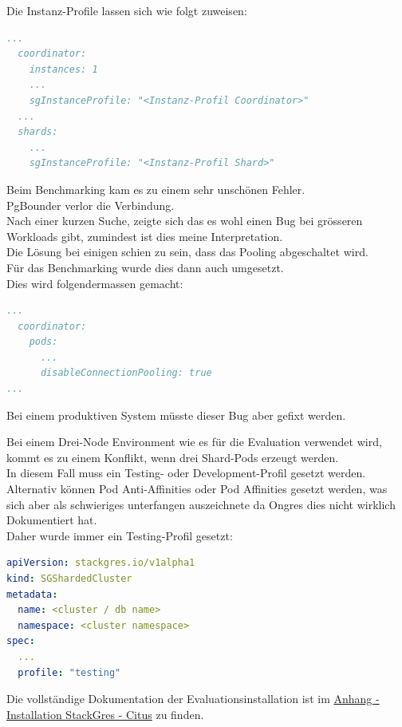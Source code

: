 \begin{flushleft}
    Die Instanz-Profile lassen sich wie folgt zuweisen:
\lstset{style=gra_codestyle}
\begin{lstlisting}[language=yaml, caption=StackGres-Citus - Instanz-Profile, captionpos=b,label={lst:stackgres-citus-sginstanceprofile},breaklines=true]
  ...
  coordinator:
    instances: 1
    ...
    sgInstanceProfile: "<Instanz-Profil Coordinator>"
  ...
  shards:
    ...
    sgInstanceProfile: "<Instanz-Profil Shard>"
\end{lstlisting}
\end{flushleft}
\begin{flushleft}
    Beim Benchmarking kam es zu einem sehr unschönen Fehler.\\
    PgBounder verlor die Verbindung.\\
    Nach einer kurzen Suche, zeigte sich das es wohl einen Bug bei grösseren Workloads gibt, zumindest ist dies meine Interpretation.\\
    Die Lösung bei einigen schien zu sein, dass das Pooling abgeschaltet wird\cite{JU2PRK9L}.\\
    Für das Benchmarking wurde dies dann auch umgesetzt.\\
    Dies wird folgendermassen gemacht:
\lstset{style=gra_codestyle}
\begin{lstlisting}[language=yaml, caption=StackGres-Citus - StorageClass -PVC Binding,captionpos=b,label={lst:stackgres-citus-disable-pooler},breaklines=true]
...
  coordinator:
    pods:
      ...
      disableConnectionPooling: true
...
\end{lstlisting}
    Bei einem produktiven System müsste dieser Bug aber gefixt werden.
\end{flushleft}
\begin{flushleft}
    Bei einem Drei-Node Environment wie es für die Evaluation verwendet wird,\\kommt es zu einem Konflikt, wenn drei Shard-Pods erzeugt werden.\\
    In diesem Fall muss ein Testing- oder Development-Profil gesetzt werden.\\
    Alternativ können Pod Anti-Affinities oder Pod Affinities gesetzt werden, was sich aber als schwieriges unterfangen auszeichnete da Ongres dies nicht wirklich Dokumentiert hat.\\
    Daher wurde immer ein Testing-Profil gesetzt:
\lstset{style=gra_codestyle}
\begin{lstlisting}[language=yaml, caption=StackGres-Citus - Cluster Profil,captionpos=b,label={lst:stackgres-citus-cluster-profile},breaklines=true]
apiVersion: stackgres.io/v1alpha1
kind: SGShardedCluster
metadata:
  name: <cluster / db name>
  namespace: <cluster namespace>
spec:
  ...
  profile: "testing"
\end{lstlisting}
\end{flushleft}
\begin{flushleft}
    Die vollständige Dokumentation der Evaluationsinstallation ist im \hyperref[subsec:evaluation_installation_stackgres]{Anhang - Installation StackGres - Citus} zu finden.
\end{flushleft}